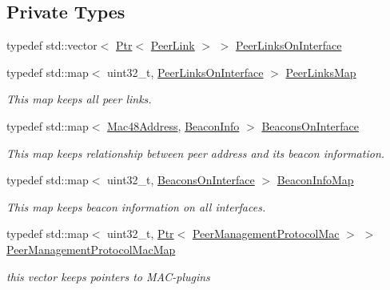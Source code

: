 \subsection*{Private Types}
\begin{DoxyCompactItemize}
\item 
typedef std\+::vector$<$ \hyperlink{classns3_1_1Ptr}{Ptr}$<$ \hyperlink{classns3_1_1dot11s_1_1PeerLink}{Peer\+Link} $>$ $>$ \hyperlink{classns3_1_1dot11s_1_1PeerManagementProtocol_a97f867fbb15c916217ced3944d07e7a7}{Peer\+Links\+On\+Interface}
\item 
typedef std\+::map$<$ uint32\+\_\+t, \hyperlink{classns3_1_1dot11s_1_1PeerManagementProtocol_a97f867fbb15c916217ced3944d07e7a7}{Peer\+Links\+On\+Interface} $>$ \hyperlink{classns3_1_1dot11s_1_1PeerManagementProtocol_a7ba0d500fa18d5db84f8795e005839a4}{Peer\+Links\+Map}
\begin{DoxyCompactList}\small\item\em This map keeps all peer links. \end{DoxyCompactList}\item 
typedef std\+::map$<$ \hyperlink{classns3_1_1Mac48Address}{Mac48\+Address}, \hyperlink{structns3_1_1dot11s_1_1PeerManagementProtocol_1_1BeaconInfo}{Beacon\+Info} $>$ \hyperlink{classns3_1_1dot11s_1_1PeerManagementProtocol_a0a15aa4827ac49dc6dfd2c808fdde1a0}{Beacons\+On\+Interface}
\begin{DoxyCompactList}\small\item\em This map keeps relationship between peer address and its beacon information. \end{DoxyCompactList}\item 
typedef std\+::map$<$ uint32\+\_\+t, \hyperlink{classns3_1_1dot11s_1_1PeerManagementProtocol_a0a15aa4827ac49dc6dfd2c808fdde1a0}{Beacons\+On\+Interface} $>$ \hyperlink{classns3_1_1dot11s_1_1PeerManagementProtocol_a64ff032a1e847fb139322aca90d96d8f}{Beacon\+Info\+Map}
\begin{DoxyCompactList}\small\item\em This map keeps beacon information on all interfaces. \end{DoxyCompactList}\item 
typedef std\+::map$<$ uint32\+\_\+t, \hyperlink{classns3_1_1Ptr}{Ptr}$<$ \hyperlink{classns3_1_1dot11s_1_1PeerManagementProtocolMac}{Peer\+Management\+Protocol\+Mac} $>$ $>$ \hyperlink{classns3_1_1dot11s_1_1PeerManagementProtocol_a2fa189c91fb5125db3221e109005260a}{Peer\+Management\+Protocol\+Mac\+Map}
\begin{DoxyCompactList}\small\item\em this vector keeps pointers to M\+A\+C-\/plugins \end{DoxyCompactList}\end{DoxyCompactItemize}

